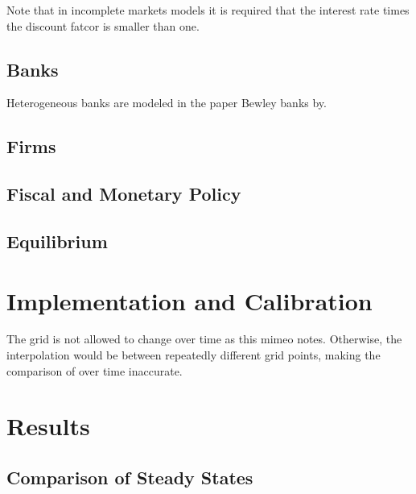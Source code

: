 \documentclass[12pt]{article}
\numberwithin{equation}{section} %
\begin{document}
Note that in incomplete markets models it is required that the interest rate times the discount fatcor is smaller than one.

\subsection{Banks}
\label{sec:model-banks}

Heterogeneous banks are modeled in the paper Bewley banks by.

\subsection{Firms}
\label{sec:model-firms}

\subsection{Fiscal and Monetary Policy}
\label{sec:model-policy}

\subsection{Equilibrium}
\label{sec:model-eq}

\section{Implementation and Calibration}
\label{sec:implementation}

The grid is not allowed to change over time as this mimeo notes. Otherwise, the interpolation would be between repeatedly different grid points, making the comparison of over time inaccurate. 

\section{Results}
\label{sec:results}

\subsection{Comparison of Steady States}
\label{sec:results-stst}
\end{document}
